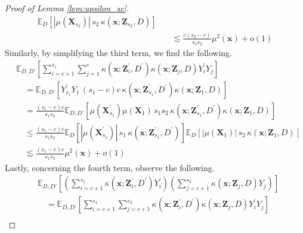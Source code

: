 \documentclass[letterpaper,10pt]{article}
\numberwithin{equation}{section}
\numberwithin{thm}{section}
\numberwithin{lem}{section}
\numberwithin{cor}{section}
\newcommand{\E}{\mathbb{E}}
\newcommand{\1}{\mathbbm{1}}
\begin{document}
\begin{proof}[Proof of Lemma \ref{lem:upsilon_sc}]
\begin{equation}
\begin{aligned}
			\E_{D}\left[|\mu(\mathbf{X}_{s_2})| \, s_2  \,\kappa(\mathbf{x}; \mathbf{Z}_{s_2}, D)\right]                                                                              \\
			 & \quad \lesssim \frac{c(s_2 - c)}{s_1 s_2} \mu^2(\mathbf{x}) + o(1)
		\end{aligned}
	\end{equation}
	Similarly, by simplifying the third term, we find the following.
	\begin{equation}
		\begin{aligned}
			 & \E_{D, D'}\left[\sum_{i = c+1}^{s_1}\sum_{j = 1}^{c} \kappa(\mathbf{x}; \mathbf{Z}_i^{\prime}, D^{\prime})\kappa(\mathbf{x}; \mathbf{Z}_j, D)Y_i^{\prime} Y_j\right]                                                \\
			 & \quad = \E_{D, D'}\left[Y_{s_1}^{\prime} Y_{1} \, (s_1 - c)c \, \kappa(\mathbf{x}; \mathbf{Z}_{s_1}^{\prime}, D^{\prime})\kappa(\mathbf{x}; \mathbf{Z}_1, D)\right]                                                 \\
			 & \quad = \frac{(s_1 - c)c}{s_1 s_2}\E_{D, D'}\left[\mu(\mathbf{X}_{s_1}^{\prime})\mu(\mathbf{X}_1) \, s_1 s_2 \, \kappa(\mathbf{x}; \mathbf{Z}_{s_1}^{\prime}, D^{\prime})\kappa(\mathbf{x}; \mathbf{Z}_1, D)\right] \\
			 & \quad \leq \frac{(s_1 - c)c}{s_1 s_2}
			\E_{D}\left[|\mu(\mathbf{X}_{s_1}^{\prime})| \, s_1 \, \kappa(\mathbf{x}; \mathbf{Z}_{s_1}^{\prime}, D^{\prime})\right]
			\E_{D}\left[|\mu(\mathbf{X}_1)| \, s_2 \, \kappa(\mathbf{x}; \mathbf{Z}_1, D)\right]                                                                                                                                   \\
			 & \quad \lesssim \frac{(s_1 - c)c}{s_1 s_2} \mu^2(\mathbf{x}) + o(1)
		\end{aligned}
	\end{equation}
	Lastly, concerning the fourth term, observe the following.
	\begin{equation}
		\begin{aligned}
			 & \E_{D, D'}\left[\left(\sum_{i = c+1}^{s_1}\kappa(\mathbf{x}; \mathbf{Z}_i^{\prime}, D^{\prime}) Y_i^{\prime}\right)
			\left(\sum_{j = c+1}^{s_2} \kappa(\mathbf{x}; \mathbf{Z}_j, D) Y_j\right)\right]                                                                                                                                                         \\
			 & \quad = \E_{D, D'}\left[\sum_{i = c+1}^{s_1}\sum_{j = c+1}^{s_2}\kappa(\mathbf{x}; \mathbf{Z}_i^{\prime}, D^{\prime}) \kappa(\mathbf{x}; \mathbf{Z}_j, D)  Y_i^{\prime}Y_j\right]                                                     \\

\end{aligned}
\end{equation}
\end{proof}
\end{document}
